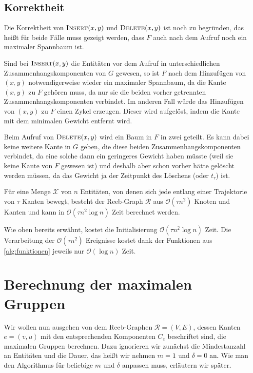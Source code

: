 \subsection{Korrektheit} %
\label{sub:korrektheit_xy}
Die Korrektheit von $\textsc{Insert}(x,y)$ und $\textsc{Delete}(x,y)$ ist noch zu begründen, das heißt für beide Fälle muss gezeigt werden, dass $F$ auch nach dem Aufruf noch ein maximaler Spannbaum ist.

Sind bei $\textsc{Insert}(x,y)$ die Entitäten vor dem Aufruf in unterschiedlichen Zusammenhangskomponenten von $G$ gewesen, so ist $F$ nach dem Hinzufügen von $(x,y)$ notwendigerweise wieder ein maximaler Spannbaum, da die Kante $(x,y)$ zu $F$ gehören muss, da nur sie die beiden vorher getrennten Zusammenhangskomponenten verbindet.
Im anderen Fall würde das Hinzufügen von $(x,y)$ zu $F$ einen Zykel erzeugen.
Dieser wird aufgelöst, indem die Kante mit dem minimalen Gewicht entfernt wird.

Beim Aufruf von $\textsc{Delete}(x,y)$ wird ein Baum in $F$ in zwei geteilt.
Es kann dabei keine weitere Kante in $G$ geben, die diese beiden Zusammenhangskomponenten verbindet, da eine solche dann ein geringeres Gewicht haben müsste (weil sie keine Kante von $F$ gewesen ist) und deshalb aber schon vorher hätte gelöscht werden müssen, da das Gewicht ja der Zeitpunkt des Löschens (oder $t_\tau$) ist.

\begin{satz}[{name={\cite[Thm.~7]{buchin2015}}}]
	Für eine Menge $\mathcal{X}$ von $n$ Entitäten, von denen sich jede entlang einer Trajektorie von $\tau$ Kanten bewegt, besteht der Reeb-Graph $\mathcal{R}$ aus $\mathcal{O}(\tau n^2)$ Knoten und Kanten und kann in $\mathcal{O}(\tau n^2 \log n)$ Zeit berechnet werden.
\end{satz}
\begin{beweis}
	Wie oben bereits erwähnt, kostet die Initialisierung $\mathcal{O}(\tau n^2 \log n)$ Zeit.
	Die Verarbeitung der $\mathcal{O}(\tau n^2)$ Ereignisse kostet dank der Funktionen aus \cref{alg:funktionen} jeweils nur $\mathcal{O}(\log n)$ Zeit.
\end{beweis}

\section{Berechnung der maximalen Gruppen} %
\label{sec:berechnung_maximale_gruppen}
Wir wollen nun ausgehen von dem Reeb-Graphen $\mathcal{R}=(V,E)$, dessen Kanten $e=(v,u)$ mit den entsprechenden Komponenten $C_e$ beschriftet sind, die maximalen Gruppen berechnen.
Dazu ignorieren wir zunächst die Mindestanzahl an Entitäten und die Dauer, das heißt wir nehmen $m=1$ und $\delta=0$ an.
Wie man den Algorithmus für beliebige $m$ und $\delta$ anpassen muss, erläutern wir später.

